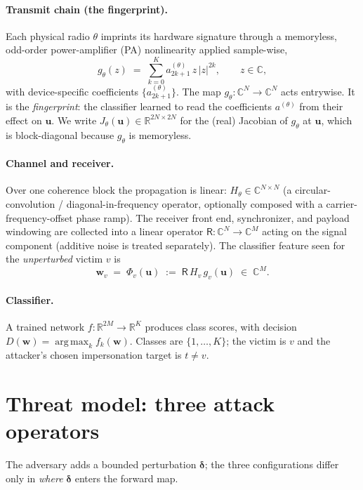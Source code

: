\documentclass[11pt]{article}
\theoremstyle{definition}
\newcommand{\C}{\mathbb{C}}
\newcommand{\R}{\mathbb{R}}
\newcommand{\Rx}{\mathsf{R}}
\newcommand{\bu}{\bm{u}}
\newcommand{\bw}{\bm{w}}
\newcommand{\bd}{\bm{\delta}}
\DeclareMathOperator*{\argmax}{arg\,max}
\begin{document}
\paragraph{Transmit chain (the fingerprint).} Each physical radio $\theta$ imprints its
hardware signature through a memoryless, odd-order power-amplifier (PA) nonlinearity applied
sample-wise,
\begin{equation}\label{eq:pa}
  g_\theta(z) \;=\; \sum_{k=0}^{K} a^{(\theta)}_{2k+1}\, z\,\lvert z\rvert^{2k},
  \qquad z\in\C,
\end{equation}
with device-specific coefficients $\{a^{(\theta)}_{2k+1}\}$. The map
$g_\theta:\C^N\to\C^N$ acts entrywise. It is the \emph{fingerprint}: the classifier learned to
read the coefficients $a^{(\theta)}$ from their effect on $\bu$. We write
$J_\theta(\bu)\in\R^{2N\times 2N}$ for the (real) Jacobian of $g_\theta$ at $\bu$, which is
block-diagonal because $g_\theta$ is memoryless.

\paragraph{Channel and receiver.} Over one coherence block the propagation is linear:
$H_\theta\in\C^{N\times N}$ (a circular-convolution / diagonal-in-frequency operator, optionally
composed with a carrier-frequency-offset phase ramp). The receiver front end, synchronizer, and
payload windowing are collected into a linear operator $\Rx:\C^{N}\to\C^{M}$ acting on the
signal component (additive noise is treated separately). The classifier feature seen for the
\emph{unperturbed} victim $v$ is
\begin{equation}\label{eq:wv}
  \bw_v \;=\; \Phi_v(\bu) \;:=\; \Rx\,H_v\,g_v(\bu)\;\in\;\C^{M}.
\end{equation}

\paragraph{Classifier.} A trained network $f:\R^{2M}\to\R^{K}$ produces class scores, with
decision $D(\bw)=\argmax_{k} f_k(\bw)$. Classes are $\{1,\dots,K\}$; the victim is $v$ and the
attacker's chosen impersonation target is $t\neq v$.

\section{Threat model: three attack operators}

The adversary adds a bounded perturbation $\bd$; the three configurations differ only in
\emph{where} $\bd$ enters the forward map.
\end{document}
